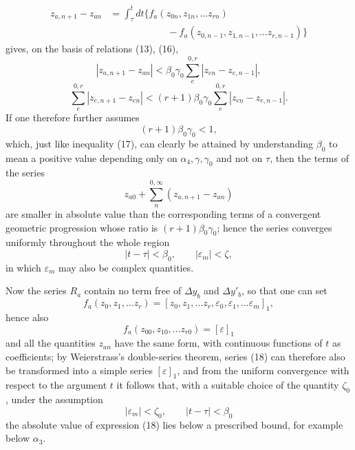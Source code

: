 \documentclass[11pt,a4paper,leqno]{article}
\begin{document}
\[
\begin{aligned}
z_{a,n+1}-z_{an}
&=\int_\tau^t dt\bigl\{f_a(z_{0n},z_{1n},\ldots z_{rn})\\
&\hspace{6em}-f_a(z_{0,n-1},z_{1,n-1},\ldots z_{r,n-1})\bigr\}
\end{aligned}
\]
gives, on the basis of relations (13), (16),
\[
|z_{a,n+1}-z_{an}|<\beta_0\gamma_0
\sum_e^{0,r}|z_{en}-z_{e,n-1}|,
\]
\[
\sum_e^{0,r}|z_{e,n+1}-z_{en}|<(r+1)\beta_0\gamma_0
\sum_e^{0,r}|z_{en}-z_{e,n-1}|.
\]
If one therefore further assumes
\[
(r+1)\beta_0\gamma_0<1,
\]
which, just like inequality (17), can clearly be attained by understanding
$\beta_0$ to mean a positive value depending only on
$\alpha_4,\gamma,\gamma_0$ and not on $\tau$, then the terms of the series
\begin{equation}\tag{18}
z_{a0}+\sum_n^{0,\infty}(z_{a,n+1}-z_{an})
\end{equation}
are smaller in absolute value than the corresponding terms of a convergent
geometric progression whose ratio is $(r+1)\beta_0\gamma_0$; hence the
series converges uniformly throughout the whole region
\[
|t-\tau|<\beta_0,\qquad |\varepsilon_m|<\zeta,
\]
in which $\varepsilon_m$ may also be complex quantities.

Now the series $R_a$ contain no term free of $\Delta y_b$ and
$\Delta y'_b$, so that one can set
\[
f_a(z_0,z_1,\ldots z_r)
=[z_0,z_1,\ldots z_r,\varepsilon_0,\varepsilon_1,\ldots\varepsilon_m]_1,
\]
hence also
\[
f_a(z_{00},z_{10},\ldots z_{r0})=[\varepsilon]_1
\]
and all the quantities $z_{an}$ have the same form, with continuous
functions of $t$ as coefficients; by Weierstrass's double-series theorem,
series (18) can therefore also be transformed into a simple series
$[\varepsilon]_1$, and from the uniform convergence with respect to the
argument $t$ it follows that, with a suitable choice of the quantity
$\zeta_0$, under the assumption
\begin{equation}\tag{19}
|\varepsilon_m|<\zeta_0,\qquad |t-\tau|<\beta_0
\end{equation}
the absolute value of expression (18) lies below a prescribed bound, for
example below $\alpha_3$.
\end{document}
